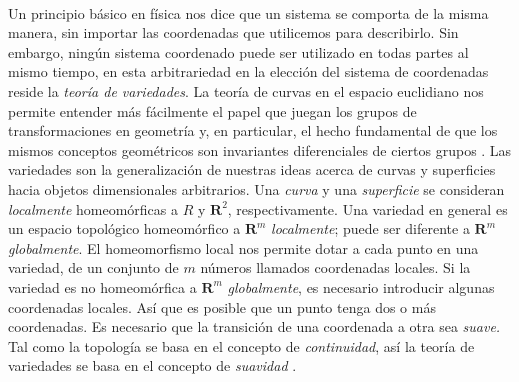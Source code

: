 \documentclass{article}
\theoremstyle{definition} \newtheorem{defi}{Definici\'on}
\theoremstyle{definition} \newtheorem{teo}{Teorema}
\theoremstyle{definition} \newtheorem{cor}{Corolario}
\begin{document}
\paragraph{}
Un principio b\'asico en f\'isica nos dice que un sistema se comporta de la misma manera, sin importar las coordenadas que utilicemos para describirlo. Sin embargo, ning\'un sistema coordenado puede ser utilizado en todas partes al mismo tiempo, en esta arbitrariedad en la elecci\'on del sistema de coordenadas reside la \emph{teor\'ia de variedades}. La teor\'ia de curvas en el espacio euclidiano nos permite entender m\'as f\'acilmente el papel que juegan los grupos de transformaciones en geometr\'ia y, en particular, el hecho fundamental de que los mismos conceptos geom\'etricos son invariantes diferenciales de ciertos grupos \cite{AE}. Las variedades son la generalizaci\'on de nuestras ideas acerca de curvas y superficies hacia objetos dimensionales arbitrarios. Una \emph{curva} y una \emph{superficie} se consideran \emph{localmente} homeom\'orficas a $R$ y $\mathbf{R}^2$, respectivamente. Una variedad en general es un espacio topol\'ogico homeom\'orfico a $\mathbf{R}^m$ \emph{localmente}; puede ser diferente a $\mathbf{R}^m$ \emph{globalmente}. El homeomorfismo local nos permite dotar a cada punto en una variedad, de un conjunto de $m$ n\'umeros llamados  coordenadas locales. Si la variedad es no homeom\'orfica a $\mathbf{R}^m$ \emph{globalmente}, es necesario introducir algunas coordenadas locales. As\'i que es posible que un punto tenga dos o m\'as coordenadas. Es necesario que la transici\'on de una coordenada a otra sea \emph{suave.} Tal como la topolog\'ia se basa en el concepto de \emph{continuidad}, as\'i la teor\'ia de variedades se basa en el concepto de \emph{suavidad} \cite{NA}.
\end{document}
